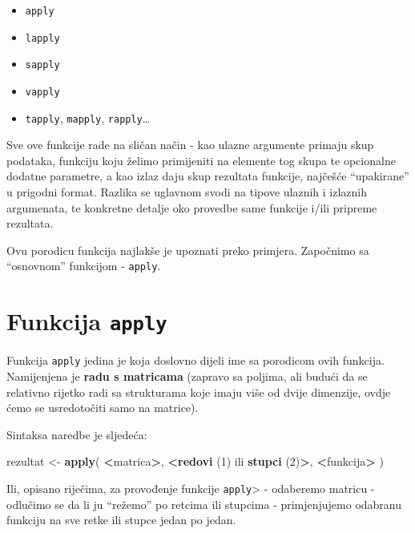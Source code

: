 \documentclass[]{book}
\newenvironment{Shaded}{\begin{snugshade}}{\end{snugshade}}
\newcommand{\KeywordTok}[1]{\textcolor[rgb]{0.13,0.29,0.53}{\textbf{#1}}}
\newcommand{\DecValTok}[1]{\textcolor[rgb]{0.00,0.00,0.81}{#1}}
\newcommand{\StringTok}[1]{\textcolor[rgb]{0.31,0.60,0.02}{#1}}
\newcommand{\OperatorTok}[1]{\textcolor[rgb]{0.81,0.36,0.00}{\textbf{#1}}}
\newcommand{\NormalTok}[1]{#1}
\providecommand{\tightlist}{%
  \setlength{\itemsep}{0pt}\setlength{\parskip}{0pt}}
\theoremstyle{definition}
\theoremstyle{definition}
\theoremstyle{definition}
\theoremstyle{remark}
\begin{document}
\begin{itemize}
\tightlist
\item
  \texttt{apply}
\item
  \texttt{lapply}
\item
  \texttt{sapply}
\item
  \texttt{vapply}
\item
  \texttt{tapply}, \texttt{mapply}, \texttt{rapply}\ldots{}
\end{itemize}

Sve ove funkcije rade na sličan način - kao ulazne argumente primaju
skup podataka, funkciju koju želimo primijeniti na elemente tog skupa te
opcionalne dodatne parametre, a kao izlaz daju skup rezultata funkcije,
najčešće ``upakirane'' u prigodni format. Razlika se uglavnom svodi na
tipove ulaznih i izlaznih argumenata, te konkretne detalje oko provedbe
same funkcije i/ili pripreme rezultata.

Ovu porodicu funkcija najlakše je upoznati preko primjera. Započnimo sa
``osnovnom'' funkcijom - \texttt{apply}.

\section{\texorpdfstring{Funkcija
\texttt{apply}}{Funkcija apply}}\label{funkcija-apply}

Funkcija \texttt{apply} jedina je koja doslovno dijeli ime sa porodicom
ovih funkcija. Namijenjena je \textbf{radu s matricama} (zapravo sa
poljima, ali budući da se relativno rijetko radi sa strukturama koje
imaju više od dvije dimenzije, ovdje ćemo se usredotočiti samo na
matrice).

Sintaksa naredbe je sljedeća:

\begin{Shaded}
\begin{Highlighting}[]
\NormalTok{rezultat <-}\StringTok{ }\KeywordTok{apply}\NormalTok{( }\OperatorTok{<}\NormalTok{matrica}\OperatorTok{>}\NormalTok{, }\OperatorTok{<}\KeywordTok{redovi}\NormalTok{ (}\DecValTok{1}\NormalTok{) ili }\KeywordTok{stupci}\NormalTok{ (}\DecValTok{2}\NormalTok{)}\OperatorTok{>}\NormalTok{, }\OperatorTok{<}\NormalTok{funkcija}\OperatorTok{>}\StringTok{ }\NormalTok{)}
\end{Highlighting}
\end{Shaded}

Ili, opisano riječima, za provođenje funkcije
\texttt{apply}\textgreater{} - odaberemo matricu - odlučimo se da li ju
``režemo'' po retcima ili stupcima - primjenjujemo odabranu funkciju na
sve retke ili stupce jedan po jedan.
\end{document}
